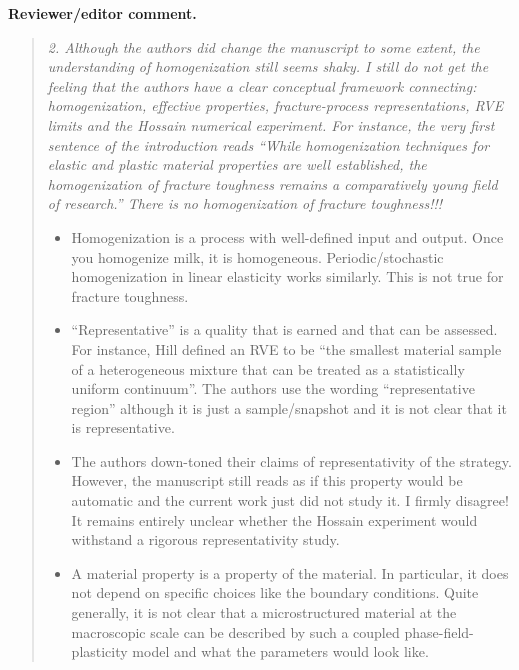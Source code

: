 \documentclass[pdflatex,sn-mathphys-num]{sn-jnl}
\newenvironment{reviewercomment}
  {\par\noindent\textbf{Reviewer/editor comment.}\begin{quote}\itshape}
  {\end{quote}}
\begin{document}
\begin{reviewercomment}
2. Although the authors did change the manuscript to some extent, the understanding of homogenization still seems
shaky. I still do not get the feeling that the authors have a clear conceptual framework connecting: homogenization,
effective properties, fracture-process representations, RVE limits and the Hossain numerical experiment. For instance,
the very first sentence of the introduction reads ``While homogenization techniques for elastic and plastic material
properties are well established, the homogenization of fracture toughness remains a comparatively young field of
research.'' There is no homogenization of fracture toughness!!!
\begin{itemize}
\item Homogenization is a process with well-defined input and output. Once you homogenize milk, it is homogeneous.
Periodic/stochastic homogenization in linear elasticity works similarly. This is not true for fracture toughness.
\item ``Representative'' is a quality that is earned and that can be assessed. For instance, Hill defined an RVE to be
``the smallest material sample of a heterogeneous mixture that can be treated as a statistically uniform continuum''.
The authors use the wording ``representative region'' although it is just a sample/snapshot and it is not clear that it
is representative.
\item The authors down-toned their claims of representativity of the strategy. However, the manuscript still reads as
if this property would be automatic and the current work just did not study it. I firmly disagree! It remains entirely
unclear whether the Hossain experiment would withstand a rigorous representativity study.
\item A material property is a property of the material. In particular, it does not depend on specific choices like the
boundary conditions. Quite generally, it is not clear that a microstructured material at the macroscopic scale can be
described by such a coupled phase-field-plasticity model and what the parameters would look like.
\end{itemize}
\end{reviewercomment}
\end{document}
